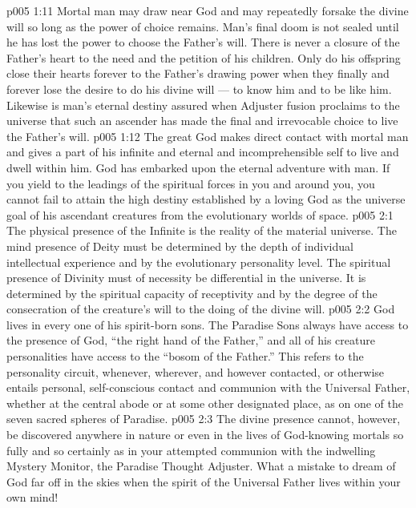 \vs p005 1:11 Mortal man may draw near God and may repeatedly forsake the divine will so long as the power of choice remains. Man’s final doom is not sealed until he has lost the power to choose the Father’s will. There is never a closure of the Father’s heart to the need and the petition of his children. Only do his offspring close their hearts forever to the Father’s drawing power when they finally and forever lose the desire to do his divine will --- to know him and to be like him. Likewise is man’s eternal destiny assured when Adjuster fusion proclaims to the universe that such an ascender has made the final and irrevocable choice to live the Father’s will.
\vs p005 1:12 The great God makes direct contact with mortal man and gives a part of his infinite and eternal and incomprehensible self to live and dwell within him. God has embarked upon the eternal adventure with man. If you yield to the leadings of the spiritual forces in you and around you, you cannot fail to attain the high destiny established by a loving God as the universe goal of his ascendant creatures from the evolutionary worlds of space.
\vs p005 2:1 The physical presence of the Infinite is the reality of the material universe. The mind presence of Deity must be determined by the depth of individual intellectual experience and by the evolutionary personality level. The spiritual presence of Divinity must of necessity be differential in the universe. It is determined by the spiritual capacity of receptivity and by the degree of the consecration of the creature’s will to the doing of the divine will.
\vs p005 2:2 God lives in every one of his spirit\hyp{}born sons. The Paradise Sons always have access to the presence of God, “the right hand of the Father,” and all of his creature personalities have access to the “bosom of the Father.” This refers to the personality circuit, whenever, wherever, and however contacted, or otherwise entails personal, self\hyp{}conscious contact and communion with the Universal Father, whether at the central abode or at some other designated place, as on one of the seven sacred spheres of Paradise.
\vs p005 2:3 The divine presence cannot, however, be discovered anywhere in nature or even in the lives of God\hyp{}knowing mortals so fully and so certainly as in your attempted communion with the indwelling Mystery Monitor, the Paradise Thought Adjuster. What a mistake to dream of God far off in the skies when the spirit of the Universal Father lives within your own mind!
